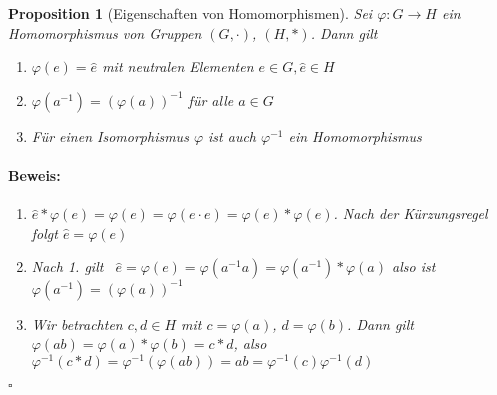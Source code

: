 \documentclass{report}
\theoremstyle{customrem}
\theoremstyle{customdef}
\newtheorem{prop}[definition]{Proposition}
\renewenvironment{proof}{\vspace{-.75cm}\paragraph{Beweis: }}{\vspace{-.5cm}\hfill$\square$}
\begin{document}
	\begin{prop}[Eigenschaften von Homomorphismen]
		Sei $\varphi : G \to H$ ein Homomorphismus von Gruppen $(G, \cdot)$, $(H, \ast)$. Dann gilt
		\begin{enumerate}
			\itemsep0cm
			\item $\varphi(e) = \hat{e}$ mit neutralen Elementen $e \in G, \hat{e} \in H$
			\item $\varphi(a^{-1}) = (\varphi(a))^{-1}$ für alle $a \in G$
			\item Für einen Isomorphismus $\varphi$ ist auch $\varphi^{-1}$ ein Homomorphismus
		\end{enumerate}
		\begin{proof}
			\begin{enumerate}
				\item $\hat{e} * \varphi(e) = \varphi(e) = \varphi(e \cdot e) = \varphi(e) * \varphi(e)$. Nach der Kürzungsregel folgt $\hat{e} = \varphi(e)$
				\item Nach 1. gilt \ $\hat{e} = \varphi(e) = \varphi(a^{-1} a) = \varphi(a^{-1}) * \varphi(a)$ also ist $\varphi(a^{-1}) = (\varphi(a))^{-1}$				
				\item Wir betrachten $c, d \in H$ mit $c = \varphi(a)$, $d = \varphi(b)$. Dann gilt $\varphi(a b) = \varphi(a) * \varphi(b) = c * d$, also $\varphi^{-1}(c * d) = \varphi^{-1}(\varphi(a b)) = ab = \varphi^{-1}(c) \varphi^{-1}(d)$
			\end{enumerate}	
		\end{proof}
		

\end{prop}
\end{document}
